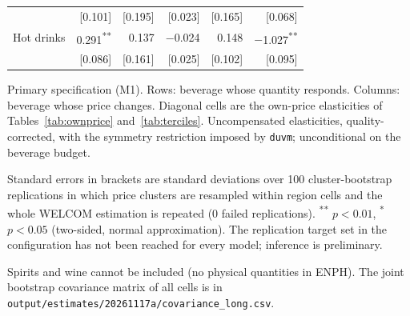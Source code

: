 \documentclass[
  11pt,
]{article}
\begin{document}
\begin{table}[!htbp]
\begin{threeparttable}
\begin{tabular}{lrrrrr}
 & [0.101] & [0.195] & [0.023] & [0.165] & [0.068] \\
Hot drinks & 0.291\textsuperscript{**} & 0.137 & $-$0.024 & 0.148 & $-$1.027\textsuperscript{**} \\
 & [0.086] & [0.161] & [0.025] & [0.102] & [0.095] \\
\bottomrule
\end{tabular}
\begin{tablenotes}[flushleft]
\footnotesize
\item Primary specification (M1). Rows: beverage whose quantity responds. Columns: beverage whose price changes. Diagonal cells are the own-price elasticities of Tables~\ref{tab:ownprice} and~\ref{tab:terciles}. Uncompensated elasticities, quality-corrected, with the symmetry restriction imposed by \texttt{duvm}; unconditional on the beverage budget.
\item Standard errors in brackets are standard deviations over 100 cluster-bootstrap replications in which price clusters are resampled within region cells and the whole WELCOM estimation is repeated (0 failed replications). \textsuperscript{**} $p<0.01$, \textsuperscript{*} $p<0.05$ (two-sided, normal approximation). The replication target set in the configuration has not been reached for every model; inference is preliminary.
\item Spirits and wine cannot be included (no physical quantities in ENPH). The joint bootstrap covariance matrix of all cells is in \texttt{output/estimates/20261117a/covariance\_long.csv}.
\end{tablenotes}
\end{threeparttable}
\end{table}

\clearpage
\end{document}
